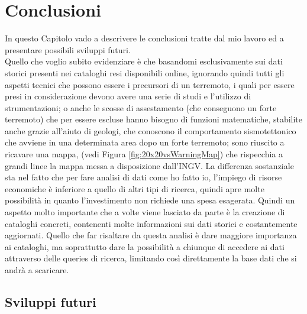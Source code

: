\chapter{Conclusioni}\label{conclusion}
In questo Capitolo vado a descrivere le conclusioni tratte dal mio lavoro ed a presentare possibili sviluppi futuri.\\
Quello che voglio subito evidenziare \`e che basandomi esclusivamente sui dati storici presenti nei cataloghi resi disponibili online, ignorando quindi tutti gli aspetti tecnici che possono essere i precursori di un terremoto, i quali per essere presi in considerazione devono avere una serie di studi e l'utilizzo di strumentazioni; o anche le scosse di assestamento (che conseguono un forte terremoto) che per essere escluse hanno bisogno di funzioni matematiche, stabilite anche grazie all'aiuto di geologi, che conoscono il comportamento sismotettonico che avviene in una determinata area dopo un forte terremoto; sono riuscito a ricavare una mappa, (vedi Figura \ref{fig:20x20vsWarningMap}) che rispecchia a grandi linee la mappa messa a disposizione dall'INGV. La differenza sostanziale sta nel fatto che per fare analisi di dati come ho fatto io, l'impiego di risorse economiche \`e inferiore a quello di altri tipi di ricerca, quindi apre molte possibilit\`a in quanto l'investimento non richiede una spesa esagerata. Quindi un aspetto molto importante che a volte viene lasciato da parte \`e la creazione di cataloghi concreti, contenenti molte informazioni sui dati storici e costantemente aggiornati. Quello che far risaltare da questa analisi \`e dare maggiore importanza ai cataloghi, ma soprattutto dare la possibilit\`a a chiunque di accedere ai dati attraverso delle queries di ricerca, limitando cos\`i direttamente la base dati che si andr\`a a scaricare.

\section{Sviluppi futuri}

